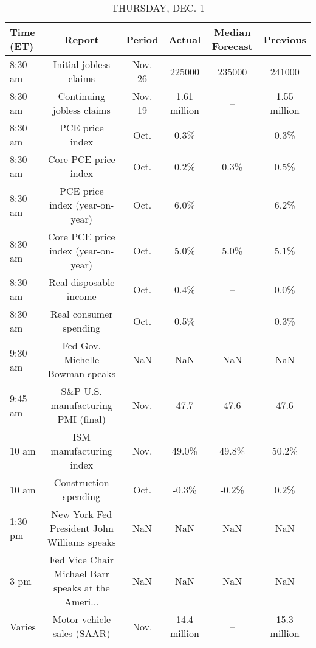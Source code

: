\documentclass{article}%
\begin{document}
%


\begin{table}[htbp]%
\caption{THURSDAY, DEC. 1}%
\centering%
\begin{adjustbox}{width=1\textwidth}%
\begin{tabular}{lccccc}
\toprule
Time (ET) &                                             Report &  Period &       Actual & Median Forecast &     Previous \\
\midrule
  8:30 am &                             Initial jobless claims & Nov. 26 &       225000 &          235000 &       241000 \\
  8:30 am &                          Continuing jobless claims & Nov. 19 & 1.61 million &              -- & 1.55 million \\
  8:30 am &                                    PCE price index &    Oct. &         0.3\% &              -- &         0.3\% \\
  8:30 am &                               Core PCE price index &    Oct. &         0.2\% &            0.3\% &         0.5\% \\
  8:30 am &                     PCE price index (year-on-year) &    Oct. &         6.0\% &              -- &         6.2\% \\
  8:30 am &                Core PCE price index (year-on-year) &    Oct. &         5.0\% &            5.0\% &         5.1\% \\
  8:30 am &                             Real disposable income &    Oct. &         0.4\% &              -- &         0.0\% \\
  8:30 am &                             Real consumer spending &    Oct. &         0.5\% &              -- &         0.3\% \\
  9:30 am &                    Fed Gov. Michelle Bowman speaks &     NaN &          NaN &             NaN &          NaN \\
  9:45 am &                 S\&P U.S. manufacturing PMI (final) &    Nov. &         47.7 &            47.6 &         47.6 \\
    10 am &                            ISM manufacturing index &    Nov. &        49.0\% &           49.8\% &        50.2\% \\
    10 am &                              Construction spending &    Oct. &        -0.3\% &           -0.2\% &         0.2\% \\
  1:30 pm &        New York Fed President John Williams speaks &     NaN &          NaN &             NaN &          NaN \\
     3 pm & Fed Vice Chair Michael Barr speaks at the Ameri... &     NaN &          NaN &             NaN &          NaN \\
   Varies &                         Motor vehicle sales (SAAR) &    Nov. & 14.4 million &              -- & 15.3 million \\
\bottomrule
\end{tabular}
%
\end{adjustbox}%
\end{table}
\end{document}
